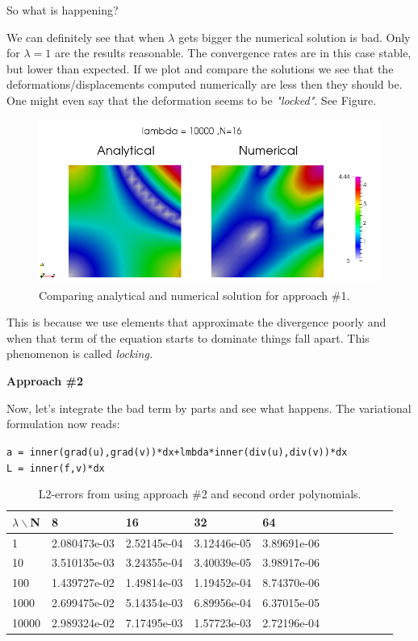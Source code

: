 \documentclass[11pt,a4paper,english]{article}
\numberwithin{equation}{section}
\begin{document}
So what is happening? 

We can definitely see that when $\lambda$ gets bigger the numerical solution is bad. Only for $\lambda=1$ are the results reasonable. The convergence rates are in this case stable, but lower than expected. If we plot and compare the solutions we see that the deformations/displacements computed numerically are less then they should be. One might even say that the deformation seems to be \emph{"locked"}. See Figure.

\begin{figure}[h!] 
\begin{center}
  \includegraphics[scale=0.4]{locking.png}
  \end{center}
  \caption{Comparing analytical and numerical solution for approach \#1.}
\end{figure}

This is because we use elements that approximate the divergence poorly and when that term of the equation starts to dominate things fall apart. This phenomenon is called \emph{locking.} 

\textbf{Approach \#2}

Now, let's integrate the bad term by parts and see what happens. The variational formulation now reads:

\begin{framed} 
\texttt{a = inner(grad(u),grad(v))*dx+lmbda*inner(div(u),div(v))*dx \\
L = inner(f,v)*dx}
\end{framed}

\begin{table}[H]
\centering
\caption{ L2-errors from using approach \#2 and second order polynomials. }
\vspace{3mm}
\begin{tabular}{|l|l|l|l|l|l|l|l|l|l|l|}
\hline
$\lambda \backslash$N & 8 & 16 & 32 & 64 \\
\hline
1 & 2.080473e-03 & 2.52145e-04 & 3.12446e-05 & 3.89691e-06 \\
\hline
10 & 3.510135e-03 & 3.24355e-04 & 3.40039e-05 & 3.98917e-06 \\
\hline
100 & 1.439727e-02 & 1.49814e-03 & 1.19452e-04 & 8.74370e-06 \\
\hline
1000 & 2.699475e-02 & 5.14354e-03 & 6.89956e-04 & 6.37015e-05 \\
\hline
10000 & 2.989324e-02 & 7.17495e-03 & 1.57723e-03 & 2.72196e-04 \\
\hline
\end{tabular}
\end{table}
\end{document}
